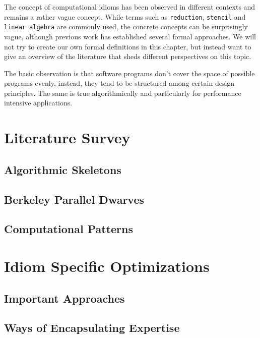 
    The concept of computational idioms has been observed in different contexts
    and remains a rather vague concept.
    While terms such as \texttt{reduction}, \texttt{stencil} and
    \texttt{linear algebra} are commonly used, the concrete concepts can be
    surprisingly vague, although previous work has established several formal
    approaches.
    We will not try to create our own formal definitions in this chapter, but
    instead want to give an overview of the literature that sheds different
    perspectives on this topic.

    The basic observation is that software programs don't cover the space of
    possible programs evenly, instead, they tend to be structured among certain
    design principles.
    The same is true algorithmically and particularly for performance intensive
    applications.

\section{Literature Survey}
\subsection{Algorithmic Skeletons}

\subsection{Berkeley Parallel Dwarves}
\subsection{Computational Patterns}

\section{Idiom Specific Optimizations}

\subsection{Important Approaches}
\subsection{Ways of Encapsulating Expertise}

